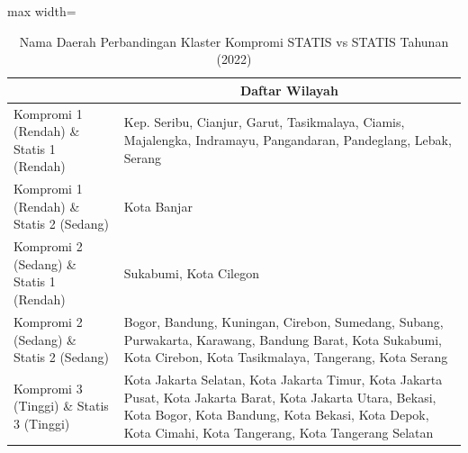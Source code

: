 \begin{table}[H]
\centering
\caption{Nama Daerah Perbandingan Klaster Kompromi STATIS vs STATIS Tahunan (2022)} \label{tab:app2comp_statis_name_2022}
\begin{adjustbox}{max width=\textwidth}
\begin{tabular}{|>{\centering\arraybackslash}p{4cm}|p{10cm}|}
\hline
\multicolumn{1}{|c|}{\textbf{Kategori}} & \multicolumn{1}{c|}{\textbf{Daftar Wilayah}} \\
\hline
Kompromi 1 (Rendah) \& Statis 1 (Rendah) & Kep. Seribu, Cianjur, Garut, Tasikmalaya, Ciamis, Majalengka, Indramayu, Pangandaran, Pandeglang, Lebak, Serang \\
\hline
Kompromi 1 (Rendah) \& Statis 2 (Sedang) & Kota Banjar \\
\hline
Kompromi 2 (Sedang) \& Statis 1 (Rendah) & Sukabumi, Kota Cilegon \\
\hline
Kompromi 2 (Sedang) \& Statis 2 (Sedang) & Bogor, Bandung, Kuningan, Cirebon, Sumedang, Subang, Purwakarta, Karawang, Bandung Barat, Kota Sukabumi, Kota Cirebon, Kota Tasikmalaya, Tangerang, Kota Serang \\
\hline
Kompromi 3 (Tinggi) \& Statis 3 (Tinggi) & Kota Jakarta Selatan, Kota Jakarta Timur, Kota Jakarta Pusat, Kota Jakarta Barat, Kota Jakarta Utara, Bekasi, Kota Bogor, Kota Bandung, Kota Bekasi, Kota Depok, Kota Cimahi, Kota Tangerang, Kota Tangerang Selatan \\
\hline
\end{tabular}
\end{adjustbox}
\end{table}